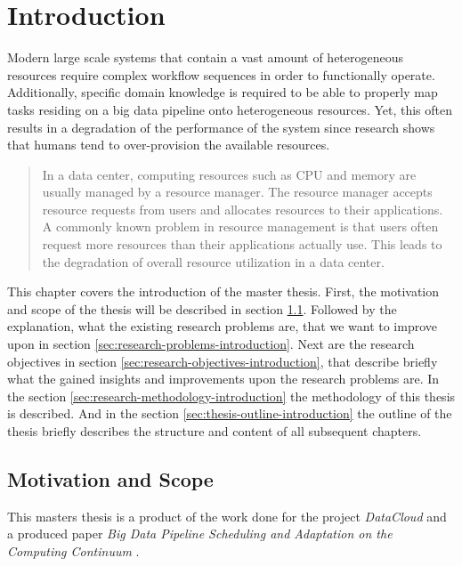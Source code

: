 \chapter{Introduction}
\label{ch:introduction}

    Modern large scale systems that contain a vast amount of heterogeneous resources require complex workflow sequences in order to functionally operate. Additionally, specific domain knowledge is required to be able to properly map tasks residing on a big data pipeline onto heterogeneous resources. Yet, this often results in a degradation of the performance of the system since research shows that humans tend to over-provision the available resources.

    \begin{quote}
        In a data center, computing resources such as CPU and memory are usually managed by a resource manager. The resource manager accepts resource requests from users and allocates resources to their applications. A commonly known problem in resource management is that users often request more resources than their applications actually use. This leads to the degradation of overall resource utilization in a data center. \cite{thonglekImprovingResourceUtilization2019}
    \end{quote}

    This chapter covers the introduction of the master thesis.
    First, the motivation and scope of the thesis will be described in section \ref{sec:motivation-and-scope-introduction}.
    Followed by the explanation, what the existing research problems are, that we want to improve upon in section \ref{sec:research-problems-introduction}. Next are the research objectives in section \ref{sec:research-objectives-introduction}, that describe briefly what the gained insights and improvements upon the research problems are. In the section \ref{sec:research-methodology-introduction} the methodology of this thesis is described. And in the section \ref{sec:thesis-outline-introduction} the outline of the thesis briefly describes the structure and content of all subsequent chapters.

        \section{Motivation and Scope}
        \label{sec:motivation-and-scope-introduction}

            This masters thesis is a product of the work done for the project \emph{DataCloud} and a produced paper \emph{Big Data Pipeline Scheduling and Adaptation on the Computing Continuum} \cite{kimovskiBigDataPipeline2022}.

